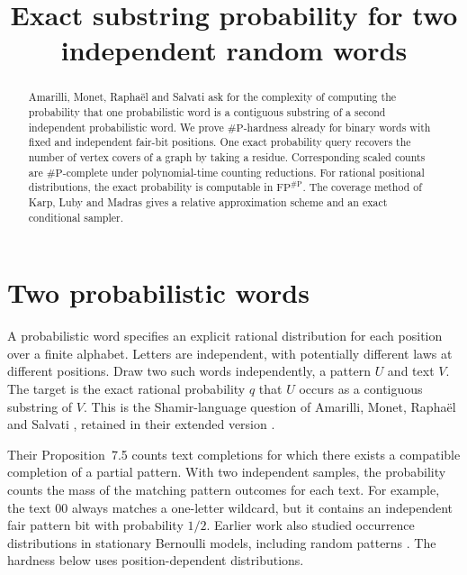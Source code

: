 \documentclass[11pt,a4paper]{amsart}
\title[Exact substring probability]{Exact substring probability for two independent random words}
\date{}
\newcommand{\sharpP}{\#\mathrm{P}}
\newcommand{\FP}{\mathrm{FP}}
\begin{document}
\begin{abstract}
Amarilli, Monet, Rapha\"el and Salvati ask for the complexity of computing the probability that one probabilistic word is a contiguous substring of a second independent probabilistic word. We prove $\sharpP$-hardness already for binary words with fixed and independent fair-bit positions. One exact probability query recovers the number of vertex covers of a graph by taking a residue. Corresponding scaled counts are $\sharpP$-complete under polynomial-time counting reductions. For rational positional distributions, the exact probability is computable in $\FP^{\sharpP}$. The coverage method of Karp, Luby and Madras gives a relative approximation scheme and an exact conditional sampler.
\end{abstract}
\maketitle

\section{Two probabilistic words}
A probabilistic word specifies an explicit rational distribution for each position over a finite alphabet. Letters are independent, with potentially different laws at different positions. Draw two such words independently, a pattern $U$ and text $V$. The target is the exact rational probability $q$ that $U$ occurs as a contiguous substring of $V$. This is the Shamir-language question of Amarilli, Monet, Rapha\"el and Salvati \cite[Section~7, p.~5:16]{amrs}, retained in their extended version \cite[Section~8, p.~38]{extended}.

Their Proposition~7.5 \cite{extended} counts text completions for which there exists a compatible completion of a partial pattern. With two independent samples, the probability counts the mass of the matching pattern outcomes for each text. For example, the text $00$ always matches a one-letter wildcard, but it contains an independent fair pattern bit with probability $1/2$. Earlier work also studied occurrence distributions in stationary Bernoulli models, including random patterns \cite{fudos}. The hardness below uses position-dependent distributions.
\end{document}
